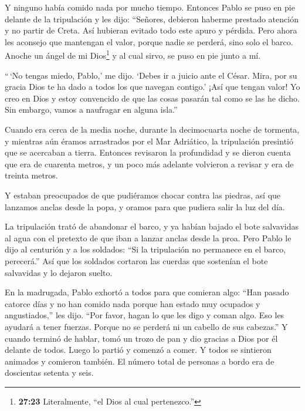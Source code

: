  Y ninguno había comido nada por mucho tiempo. Entonces
Pablo se puso en pie delante de la tripulación y les dijo: ``Señores,
debieron haberme prestado atención y no partir de Creta. Así hubieran
evitado todo este apuro y pérdida.  Pero ahora les aconsejo
que mantengan el valor, porque nadie se perderá, sino solo el barco.
 Anoche un ángel de mi Dios\footnote{\textbf{27:23}
  Literalmente, ``el Dios al cual pertenezco.''} y al cual sirvo, se
puso en pie junto a mí.

 ``\,`No tengas miedo, Pablo,' me dijo. `Debes ir a juicio
ante el César. Mira, por su gracia Dios te ha dado a todos los que
navegan contigo.'  ¡Así que tengan valor! Yo creo en Dios y
estoy convencido de que las cosas pasarán tal como se las he dicho.
 Sin embargo, vamos a naufragar en alguna isla.''

 Cuando era cerca de la media noche, durante la
decimocuarta noche de tormenta, y mientras aún éramos arrastrados por el
Mar Adriático, la tripulación presintió que se acercaban a tierra.
 Entonces revisaron la profundidad y se dieron cuenta que
era de cuarenta metros, y un poco más adelante volvieron a revisar y era
de treinta metros.

 Y estaban preocupados de que pudiéramos chocar contra las
piedras, así que lanzamos anclas desde la popa, y oramos para que
pudiera salir la luz del día.

 La tripulación trató de abandonar el barco, y ya habían
bajado el bote salvavidas al agua con el pretexto de que iban a lanzar
anclas desde la proa.  Pero Pablo le dijo al centurión y a
los soldados: ``Si la tripulación no permanece en el barco, perecerá.''
 Así que los soldados cortaron las cuerdas que sostenían el
bote salvavidas y lo dejaron suelto.

 En la madrugada, Pablo exhortó a todos para que comieran
algo: ``Han pasado catorce días y no han comido nada porque han estado
muy ocupados y angustiados,'' les dijo.  ``Por favor, hagan
lo que les digo y coman algo. Eso les ayudará a tener fuerzas. Porque no
se perderá ni un cabello de sus cabezas.''  Y cuando
terminó de hablar, tomó un trozo de pan y dio gracias a Dios por él
delante de todos. Luego lo partió y comenzó a comer.  Y
todos se sintieron animados y comieron también.  El número
total de personas a bordo era de doscientas setenta y seis.

